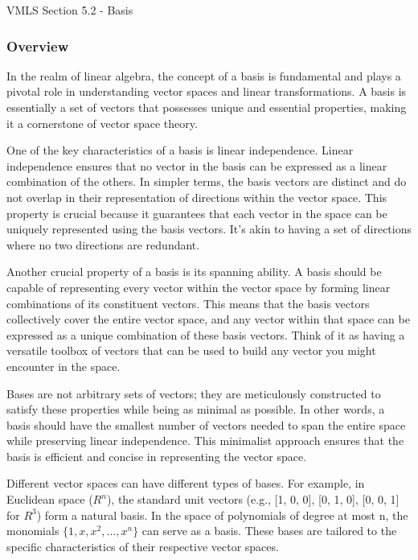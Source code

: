 \begin{notes}{VMLS Section 5.2 - Basis}
    \subsubsection*{Overview}

    In the realm of linear algebra, the concept of a basis is fundamental and plays a pivotal role in understanding vector spaces and linear transformations. A basis is essentially a set of vectors 
    that possesses unique and essential properties, making it a cornerstone of vector space theory.

    One of the key characteristics of a basis is linear independence. Linear independence ensures that no vector in the basis can be expressed as a linear combination of the others. In simpler terms, 
    the basis vectors are distinct and do not overlap in their representation of directions within the vector space. This property is crucial because it guarantees that each vector in the space can 
    be uniquely represented using the basis vectors. It's akin to having a set of directions where no two directions are redundant.
    
    Another crucial property of a basis is its spanning ability. A basis should be capable of representing every vector within the vector space by forming linear combinations of its constituent 
    vectors. This means that the basis vectors collectively cover the entire vector space, and any vector within that space can be expressed as a unique combination of these basis vectors. Think of 
    it as having a versatile toolbox of vectors that can be used to build any vector you might encounter in the space.
    
    Bases are not arbitrary sets of vectors; they are meticulously constructed to satisfy these properties while being as minimal as possible. In other words, a basis should have the smallest number 
    of vectors needed to span the entire space while preserving linear independence. This minimalist approach ensures that the basis is efficient and concise in representing the vector space.
    
    Different vector spaces can have different types of bases. For example, in Euclidean space ($R^n$), the standard unit vectors (e.g., [1, 0, 0], [0, 1, 0], [0, 0, 1] for $R^3$) form a natural basis. 
    In the space of polynomials of degree at most n, the monomials $\{1, x, x^{2}, \dots, x^{n}\}$ can serve as a basis. These bases are tailored to the specific characteristics of their respective 
    vector spaces.
    

\end{notes}
